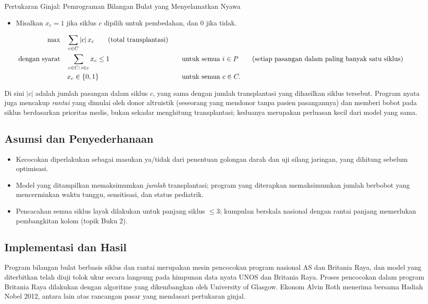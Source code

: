 \begin{casestudybox}{Pertukaran Ginjal: Pemrograman Bilangan Bulat yang Menyelamatkan Nyawa}
\begin{itemize}
\item Misalkan $x_c = 1$ jika siklus $c$ dipilih untuk pembedahan, dan $0$ jika tidak.
\end{itemize}

\begin{align*}
\max \quad & \sum_{c \in C} |c| \, x_c   \tag{total transplantasi} \\
\mbox{dengan syarat}\quad        & \sum_{c \in C :\, i \in c} x_c \leq 1 &&\quad \mbox{untuk semua } i \in P   \tag{setiap pasangan dalam paling banyak satu siklus} \\
             & x_c \in \{0,1\} &&\quad \mbox{untuk semua } c \in C.
\end{align*}

Di sini $|c|$ adalah jumlah pasangan dalam siklus $c$, yang sama dengan jumlah transplantasi yang dihasilkan siklus tersebut. Program nyata juga mencakup \emph{rantai} yang dimulai oleh donor altruistik (seseorang yang mendonor tanpa pasien pasangannya) dan memberi bobot pada siklus berdasarkan prioritas medis, bukan sekadar menghitung transplantasi; keduanya merupakan perluasan kecil dari model yang sama.

\subsection*{Asumsi dan Penyederhanaan}
\begin{itemize}
\item Kecocokan diperlakukan sebagai masukan ya/tidak dari penentuan golongan darah dan uji silang jaringan, yang dihitung sebelum optimisasi.
\item Model yang ditampilkan memaksimumkan \emph{jumlah} transplantasi; program yang diterapkan memaksimumkan jumlah berbobot yang mencerminkan waktu tunggu, sensitisasi, dan status pediatrik.
\item Pencacahan semua siklus layak dilakukan untuk panjang siklus $\le 3$; kumpulan berskala nasional dengan rantai panjang memerlukan pembangkitan kolom (topik Buku 2).
\end{itemize}

\subsection*{Implementasi dan Hasil}
Program bilangan bulat berbasis siklus dan rantai merupakan mesin pencocokan program nasional AS dan Britania Raya, dan model yang diterbitkan telah diuji tolok ukur secara langsung pada himpunan data nyata UNOS dan Britania Raya. Proses pencocokan dalam program Britania Raya dilakukan dengan algoritme yang dikembangkan oleh University of Glasgow. Ekonom Alvin Roth menerima bersama Hadiah Nobel 2012, antara lain atas rancangan pasar yang mendasari pertukaran ginjal.


\end{casestudybox}
